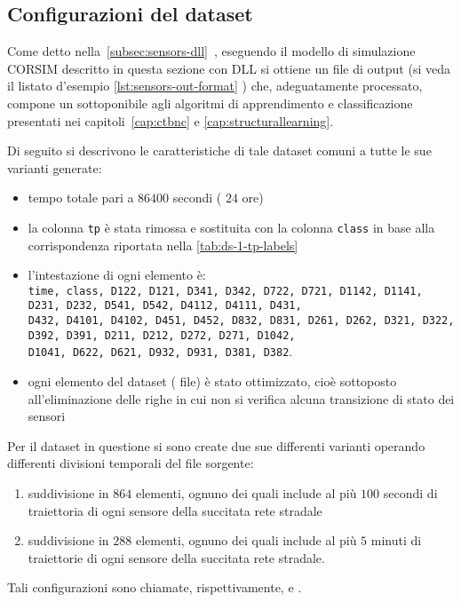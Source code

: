 \newpage
\subsection{Configurazioni del dataset}
Come detto nella~\autoref{subsec:sensors-dll}~, eseguendo il modello di simulazione \acs{CORSIM} descritto in questa sezione con  \acs{DLL} si ottiene un file di output (si veda il listato d'esempio \ref{lst:sensors-out-format} ) che, adeguatamente processato, compone un  sottoponibile agli algoritmi di apprendimento e classificazione presentati nei capitoli~\ref{cap:ctbnc} e \ref{cap:structurallearning}.

Di seguito si descrivono le caratteristiche di tale dataset comuni a tutte le sue varianti generate:
\begin{itemize}
	\item tempo totale pari a $86400$ secondi (\ie{} $24$ ore)
	\item la colonna \lstinline[]|tp| è stata rimossa e sostituita con la colonna \lstinline[]|class| in base alla corrispondenza riportata nella \vref{tab:ds-1-tp-labels}
	\item l'intestazione di ogni elemento è: \\ \lstinline[]|time, class, D122, D121, D341, D342, D722, D721, D1142, D1141, D231, D232, D541, D542, D4112, D4111, D431, |\\\lstinline[]|D432, D4101, D4102, D451, D452, D832, D831, D261, D262, D321, D322, D392, D391, D211, D212, D272, D271, D1042, |\\\lstinline[]|D1041, D622, D621, D932, D931, D381, D382|.
	\item ogni elemento del dataset (\ie{} file) è stato ottimizzato, cioè sottoposto all'eliminazione delle righe in cui non si verifica alcuna transizione di stato dei sensori
\end{itemize}

Per il dataset in questione si sono create due sue differenti varianti operando differenti divisioni temporali del file sorgente:
\begin{enumerate}
	\item suddivisione in $864$ elementi, ognuno dei quali include al più $100$ secondi di traiettoria di ogni sensore della succitata rete stradale
	\item suddivisione in $288$ elementi, ognuno dei quali include al più $5$ minuti di traiettorie di ogni sensore della succitata rete stradale.
\end{enumerate}
Tali configurazioni sono chiamate, rispettivamente,  e .


